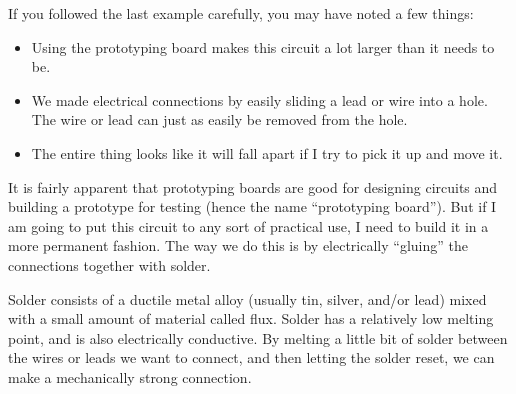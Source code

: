 If you followed the last example carefully, you may have 
noted a few things:
\begin{itemize}
\item Using the prototyping board makes this circuit a lot larger than it 
needs to be.
\item We made electrical connections by easily sliding a lead or wire into a
hole. The wire or lead can just as easily be removed from the hole.
\item The entire thing looks like it will fall apart if I try to pick it up
and move it.
\end{itemize}
It is fairly apparent that prototyping boards are good for designing circuits
and building a prototype for testing (hence the name ``prototyping board'').
But if I am going to put this circuit to any sort of practical use, I need to
build it in a more permanent fashion. The way we do this is by electrically
``gluing'' the connections together with solder.

Solder consists of a ductile metal alloy (usually tin, silver, and/or lead) 
mixed with a small amount of material called flux. Solder has a relatively low
melting point, and is also electrically conductive. By melting a little bit of
solder between the wires or leads we want to connect, and then letting the 
solder reset, we can make a mechanically strong connection.

